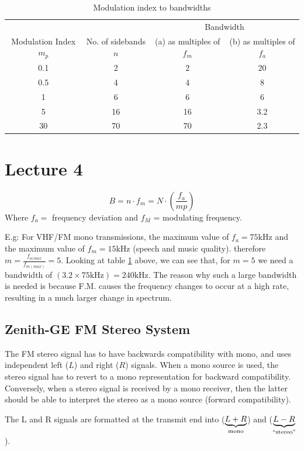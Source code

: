 \documentclass[11pt]{article} %
\begin{document}
		\begin{table}[h]
		    \begin{tabular}{cccc}
		        \hline
		 & & \multicolumn{2}{c}{Bandwidth}  \\
		Modulation Index $m_p$ & No. of sidebands $n$ &  (a) as multiples of $f_m$ & (b) as multiples of $f_a$ \\ \hline
			0.1 &  2 & 2 & 20 \\
			0.5 & 4 & 4 & 8 \\
			1 & 6 & 6 & 6 \\
			5 & 16 & 16 & 3.2 \\
			30 & 70 & 70 &2.3 \\
		    \end{tabular}
			\caption{Modulation index to bandwidths}
			\label{tab:modind}
		\end{table}

\section{Lecture 4}
	\begin{equation}
		B = n\cdot f_m = N\cdot\left(\frac{f_a}{mp}\right)
	\end{equation}
	Where $f_a=$ frequency deviation and $f_M$ = modulating frequency.

	E.g: For VHF/FM mono transmissions, the maximum value of $f_a=75\mbox{kHz}$ and the maximum value of $f_m=15\mbox{kHz}$ (speech and music quality).
	therefore $m = \frac{f_{a(max}}{f_{m(max)}} = 5$. 
	Looking at table \ref{tab:modind} above, we can see that, for $m=5$ we need a bandwidth of $(3.2\times 75\mbox{kHz})=240\mbox{kHz}$. 
	The reason why such a large bandwidth is needed is because F.M. causes the frequency changes to occur at a high rate, resulting in a much larger change in spectrum.

	\subsection{Zenith-GE FM Stereo System}
		The FM stereo signal has to have backwards compatibility with mono, and uses independent left ($L$) and right ($R$) signals. When a mono source is used, the stereo signal has to revert to a mono representation for backward compatibility. Conversely, when a stereo signal is received by a mono receiver, then the latter should be able to interpret the stereo as a mono source (forward compatibility).

		The L and R signals are formatted at the transmit end into ($\underbrace{L+R}_{\mbox{\scriptsize mono}}$) and ($\underbrace{L-R}_{\mbox{\scriptsize ``stereo''}}$).
\end{document}
